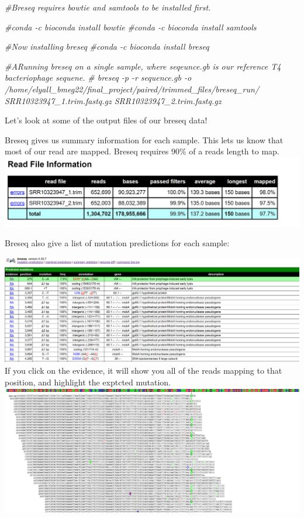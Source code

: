 \documentclass[
]{article}
\newenvironment{Shaded}{\begin{snugshade}}{\end{snugshade}}
\newcommand{\CommentTok}[1]{\textcolor[rgb]{0.56,0.35,0.01}{\textit{#1}}}
\begin{document}
\begin{Shaded}
\begin{Highlighting}[]
\CommentTok{#Breseq requires bowtie and samtools to be installed first. }

\CommentTok{#conda -c bioconda install bowtie}
\CommentTok{#conda -c bioconda install samtools}

\CommentTok{#Now installing breseq}
\CommentTok{#conda -c bioconda install breseq}

\CommentTok{#ARunning breseq on a single sample, where seqeunce.gb is our reference T4 bacteriophage sequene. }
\CommentTok{# breseq -p -r sequence.gb -o /home/elyall_bmeg22/final_project/paired/trimmed_files/breseq_run/ SRR10323947_1.trim.fastq.gz SRR10323947_2.trim.fastq.gz}
\end{Highlighting}
\end{Shaded}

Let's look at some of the output files of our breseq data!

Breseq gives us summary information for each sample. This lets us know
that most of our read are mapped. Breseq requires 90\% of a reads length
to map. \includegraphics{summary_info.png}

Breseq also give a list of mutation predictions for each sample:

\includegraphics{sample_output.png} If you click on the evidence, it
will show you all of the reads mapping to that position, and highlight
the exptcted mutation. \includegraphics{align_evidence.png}
\end{document}
